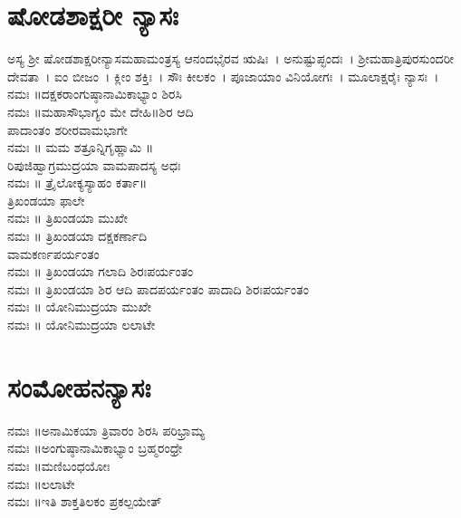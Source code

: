 \section{ಷೋಡಶಾಕ್ಷರೀ ನ್ಯಾಸಃ}
ಅಸ್ಯ ಶ್ರೀ ಷೋಡಶಾಕ್ಷರೀನ್ಯಾಸಮಹಾಮಂತ್ರಸ್ಯ ಆನಂದಭೈರವ ಋಷಿಃ~। ಅನುಷ್ಟುಪ್ಛಂದಃ~। ಶ್ರೀಮಹಾತ್ರಿಪುರಸುಂದರೀ ದೇವತಾ~। ಐಂ ಬೀಜಂ~। ಕ್ಲೀಂ ಶಕ್ತಿಃ~। ಸೌಃ ಕೀಲಕಂ~। ಪೂಜಾಯಾಂ ವಿನಿಯೋಗಃ~। ಮೂಲಾಕ್ಷರೈಃ ನ್ಯಾಸಃ~।\\
 ನಮಃ ॥ದಕ್ಷಕರಾಂಗುಷ್ಠಾನಾಮಿಕಾಭ್ಯಾಂ ಶಿರಸಿ\\
 ನಮಃ ॥ಮಹಾಸೌಭಾಗ್ಯಂ ಮೇ ದೇಹಿ॥ಶಿರ ಆದಿ\\ ಪಾದಾಂತಂ ಶರೀರವಾಮಭಾಗೇ\\
 ನಮಃ ॥ ಮಮ ಶತ್ರೂನ್ನಿಗೃಹ್ಣಾಮಿ ॥\\ರಿಪುಜಿಹ್ವಾಗ್ರಮುದ್ರಯಾ ವಾಮಪಾದಸ್ಯ ಅಧಃ\\
 ನಮಃ ॥ ತ್ರೈಲೋಕ್ಯಸ್ಯಾಹಂ ಕರ್ತಾ॥\\ತ್ರಿಖಂಡಯಾ ಫಾಲೇ\\
 ನಮಃ ॥ ತ್ರಿಖಂಡಯಾ ಮುಖೇ\\
 ನಮಃ ॥ ತ್ರಿಖಂಡಯಾ ದಕ್ಷಕರ್ಣಾದಿ \\ವಾಮಕರ್ಣಪರ್ಯಂತಂ\\
 ನಮಃ ॥ ತ್ರಿಖಂಡಯಾ ಗಲಾದಿ ಶಿರಃಪರ್ಯಂತಂ\\
 ನಮಃ ॥ ತ್ರಿಖಂಡಯಾ ಶಿರ ಆದಿ ಪಾದಪರ್ಯಂತಂ ಪಾದಾದಿ ಶಿರಃಪರ್ಯಂತಂ\\
 ನಮಃ ॥ ಯೋನಿಮುದ್ರಯಾ ಮುಖೇ\\
 ನಮಃ ॥ ಯೋನಿಮುದ್ರಯಾ ಲಲಾಟೇ
\section{ಸಂಮೋಹನನ್ಯಾಸಃ}
 ನಮಃ ॥ಅನಾಮಿಕಯಾ ತ್ರಿವಾರಂ ಶಿರಸಿ ಪರಿಭ್ರಾಮ್ಯ\\
 ನಮಃ ॥ಅಂಗುಷ್ಠಾನಾಮಿಕಾಭ್ಯಾಂ ಬ್ರಹ್ಮರಂಧ್ರೇ\\
 ನಮಃ ॥ಮಣಿಬಂಧಯೋಃ\\
 ನಮಃ ॥ಲಲಾಟೇ\\
 ನಮಃ ॥ಇತಿ ಶಾಕ್ತತಿಲಕಂ ಪ್ರಕಲ್ಪಯೇತ್
